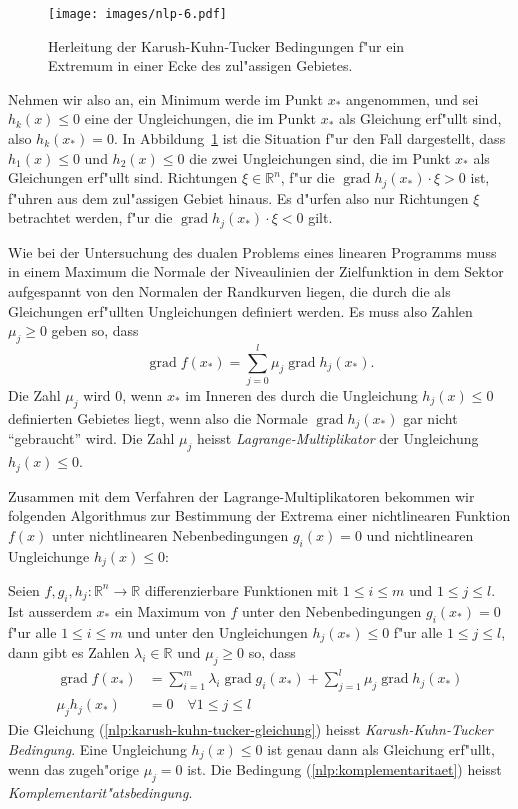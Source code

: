 \begin{figure}
\begin{center}
\texttt{[image: images/nlp-6.pdf]}
\end{center}
\caption{Herleitung der Karush-Kuhn-Tucker Bedingungen f"ur ein Extremum
in einer Ecke des zul"assigen Gebietes.
\label{nlp:kkt-ableitung}}
\end{figure}
Nehmen wir also an, ein Minimum werde im Punkt $x_*$ angenommen,
und sei $h_k(x)\le 0$ eine der Ungleichungen, die im Punkt $x_*$ 
als Gleichung erf"ullt sind, also $h_k(x_*)=0$.
In Abbildung~\ref{nlp:kkt-ableitung} ist die Situation f"ur den
Fall dargestellt, dass $h_1(x)\le 0$ und $h_2(x)\le0$ die zwei
Ungleichungen sind, die im Punkt $x_*$ als Gleichungen erf"ullt
sind.
Richtungen $\xi\in\mathbb R^n$, f"ur die
$\operatorname{grad}h_j(x_*)\cdot\xi > 0$ ist,
f"uhren aus dem zul"assigen Gebiet hinaus. Es d"urfen also nur Richtungen
$\xi$ betrachtet werden, f"ur die $\operatorname{grad}h_j(x_*)\cdot\xi <0$
gilt.

Wie bei der Untersuchung des dualen Problems eines linearen Programms
muss in einem Maximum die Normale der Niveaulinien der Zielfunktion 
in dem Sektor aufgespannt von den Normalen der Randkurven liegen,
die durch die als Gleichungen erf"ullten Ungleichungen definiert
werden. Es muss also Zahlen $\mu_j\ge 0$ geben so, dass
\[
\operatorname{grad}f(x_*)=\sum_{j=0}^l\mu_j\operatorname{grad}h_j(x_*).
\]
Die Zahl $\mu_j$ wird $0$, wenn $x_*$ im Inneren des durch die Ungleichung
$h_j(x)\le 0$ definierten Gebietes liegt, wenn also die Normale
$\operatorname{grad}h_j(x_*)$ gar nicht ``gebraucht'' wird.
Die Zahl $\mu_j$ heisst {\em Lagrange-Multiplikator} der
Ungleichung $h_j(x)\le 0$.

Zusammen mit dem Verfahren der Lagrange-Multiplikatoren bekommen wir 
folgenden Algorithmus zur Bestimmung der Extrema einer nichtlinearen
Funktion $f(x)$ unter nichtlinearen Nebenbedingungen $g_i(x)=0$
und nichtlinearen Ungleichunge $h_j(x)\le 0$:

\begin{satz}
Seien $f, g_i, h_j\colon\mathbb R^n\to \mathbb R$ differenzierbare Funktionen
mit $1\le i\le m$ und $1\le j\le l$.
Ist ausserdem $x_*$ ein Maximum von $f$ unter
den Nebenbedingungen $g_i(x_*)=0$ f"ur alle $1\le i\le m$ und unter den
Ungleichungen $h_j(x_*)\le 0$ f"ur alle $1\le j\le l$, dann gibt es
Zahlen $\lambda_i\in\mathbb R$ und $\mu_j\ge 0$ so, dass
\begin{align}
\operatorname{grad}f(x_*)
&=
\sum_{i=1}^m\lambda_i \operatorname{grad}g_i(x_*)
+
\sum_{j=1}^l\mu_j \operatorname{grad}h_j(x_*)
\label{nlp:karush-kuhn-tucker-gleichung}
\\
\mu_jh_j(x_*)&=0\quad \forall 1\le j\le l
\label{nlp:komplementaritaet}
\end{align}
Die Gleichung (\ref{nlp:karush-kuhn-tucker-gleichung}) heisst
{\em Karush-Kuhn-Tucker Bedingung}.
Eine Ungleichung $h_j(x)\le 0$ ist genau dann als Gleichung erf"ullt,
wenn das zugeh"orige $\mu_j=0$ ist.
Die Bedingung (\ref{nlp:komplementaritaet})
heisst {\em Komplementarit"atsbedingung}.
\end{satz}

